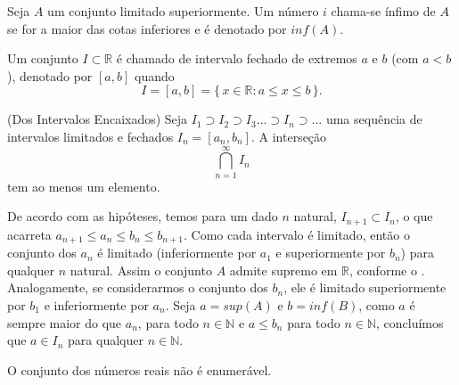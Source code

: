 \documentclass[../main.tex]{subfiles}
\begin{document}
\begin{defi}
    Seja $A$ um conjunto limitado superiormente. Um número $i$ chama-se ínfimo de $A$ se for a maior das cotas inferiores e é denotado por $inf(A)$.
\end{defi}

\begin{defi}\label{enum-def-intervalos}
    Um conjunto $I \subset \mathbb{R}$ é chamado de intervalo fechado de extremos $a$ e $b$ (com $a<b$), denotado por $[a,b]$ quando 
    \[I = [a,b] = \{\,x \in \mathbb{R} : a \leq x \leq b \,\} .\]
\end{defi}

\begin{teo}{(Dos Intervalos Encaixados)}\label{enum-teo-intervalosEncaixados}
    Seja $I_1 \supset I_2 \supset I_3 \dots \supset I_n \supset \dots$ uma sequência de intervalos limitados e fechados $I_n = [a_n, b_n]$.
    A interseção \[ \bigcap^\infty_{n=1} I_n \] tem ao menos um elemento.
\end{teo}
\begin{dem}
    De acordo com as hipóteses, temos para um dado $n$ natural, $I_{n+1} \subset I_n$, o que acarreta $a_{n+1} \leq a_n \leq b_n \leq b_{n+1}$. 
    Como cada intervalo é limitado, então o conjunto dos $a_n$ é limitado (inferiormente por $a_1$ e superiormente por $b_n$) para qualquer $n$ natural. Assim o conjunto $A$ admite supremo em $\mathbb{R}$, conforme o . Analogamente, se considerarmos o conjunto dos 
    $b_n$, ele é limitado superiormente por $b_1$ e inferiormente por $a_n$.
    Seja $a = sup(A)$ e $b = inf(B)$, como $a$ é sempre maior do que $a_n$, para todo $n \in \mathbb{N}$ e $a \leq b_n$ para todo $n \in \mathbb{N}$, concluímos que $a \in I_n$ para qualquer $n \in \mathbb{N}$.    
\end{dem}
\begin{teo}\label{enum-teo-RnaoEnumeravel}
    O conjunto dos números reais não é enumerável.
\end{teo}
\end{document}

